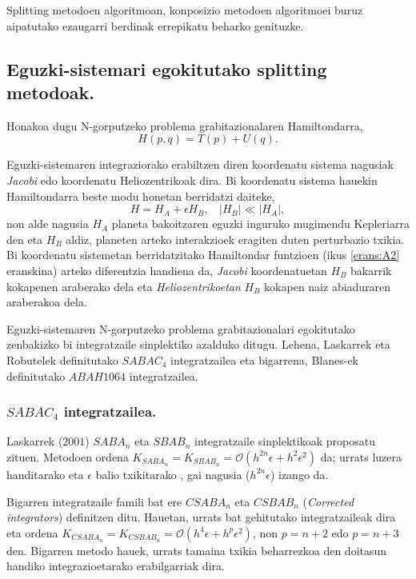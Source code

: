 Splitting metodoen algoritmoan, konposizio metodoen algoritmoei buruz aipatutako ezaugarri berdinak errepikatu beharko genituzke. 

\subsection{Eguzki-sistemari egokitutako splitting metodoak.}

Honakoa dugu N-gorputzeko problema grabitazionalaren Hamiltondarra,
\begin{equation*}
H(p,q)=T(p)+U(q).
\end{equation*}

Eguzki-sistemaren integraziorako erabiltzen diren koordenatu sistema nagusiak \emph{Jacobi} edo koordenatu Heliozentrikoak dira.  Bi koordenatu sistema hauekin Hamiltondarra beste modu honetan berridatzi daiteke,
\begin{equation*}
H=H_A+\epsilon H_B,  \ \ \ \ |H_B|\ll|H_A|,
\end{equation*}
non alde nagusia $H_A$ planeta bakoitzaren eguzki inguruko mugimendu Kepleriarra den eta $H_B$ aldiz, planeten arteko interakzioek eragiten duten perturbazio txikia. Bi koordenatu sistemetan berridatzitako Hamiltondar funtzioen (ikus \ref{erans:A2} eranskina) arteko diferentzia handiena da, \emph{Jacobi} koordenatuetan $H_B$ bakarrik kokapenen araberako dela eta \emph{Heliozentrikoetan} $H_B$ kokapen naiz abiaduraren araberakoa dela.       

Eguzki-sistemaren N-gorputzeko problema grabitazionalari egokitutako zenbakizko bi integratzaile sinplektiko azalduko ditugu. Lehena, Laskarrek eta Robutelek \cite[~2001]{Laskar2001} definitutako \emph{$SABAC_4$} integratzailea eta bigarrena, Blanes-ek \cite[~2013]{Blanes2013} \cite{Farres2013} definitutako \emph{$ABAH1064$} integratzailea. 


\subsubsection*{$SABAC_4$ integratzailea.}

Laskarrek ($2001$) $SABA_n$ eta $SBAB_n$ integratzaile sinplektikoak \cite{Laskar2001} proposatu zituen. Metodoen ordena $K_{SABA_n}=K_{SBAB_n}=\mathcal{O}(h^{2n} \epsilon+ h^2 \epsilon^2)$ da; urrats luzera handitarako eta $\epsilon$ balio txikitarako , gai nagusia ($h^{2n} \epsilon$) izango da.

Bigarren integratzaile famili bat ere $CSABA_n$ eta $CSBAB_n$ (\emph{Corrected integrators}) definitzen ditu. Hauetan, urrats bat gehitutako integratzaileak dira eta ordena $K_{CSABA_n}=K_{CSBAB_n}=\mathcal{O}(h^{4} \epsilon+ h^{p} \epsilon^2)$, non $p=n+2$ edo $p=n+3$ den. Bigarren metodo hauek, urrats tamaina txikia beharrezkoa den  doitasun handiko integrazioetarako erabilgarriak dira.

